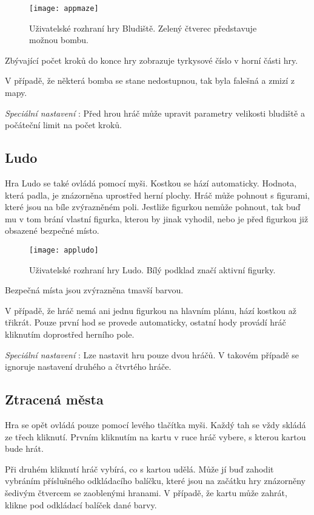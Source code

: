 \begin{figure}
  \centering
  \texttt{[image: appmaze]}
	\caption{Uživatelské rozhraní hry Bludiště. Zelený čtverec představuje možnou bombu. }
	\label{fig-appmaze}
\end{figure}

Zbývající počet kroků do konce hry zobrazuje tyrkysové číslo v horní části hry. 

V případě, že některá bomba se stane nedostupnou, tak byla falešná a zmizí z mapy.

\emph{Speciální nastavení} : Před hrou hráč může upravit parametry velikosti bludiště a počáteční limit na počet kroků.

\subsection{Ludo}

Hra Ludo se také ovládá pomocí myši. Kostkou se hází automaticky. Hodnota, která padla, je znázorněna uprostřed herní plochy. Hráč může pohnout s figurami, které jsou na bíle zvýrazněném poli. Jestliže figurkou nemůže pohnout, tak buď mu v tom brání vlastní figurka, kterou by jinak vyhodil, nebo je před figurkou již obsazené bezpečné místo.

\begin{figure}
  \centering
  \texttt{[image: appludo]}
	\caption{Uživatelské rozhraní hry Ludo. Bílý podklad značí aktivní figurky. }
	\label{fig-appludo}
\end{figure}

Bezpečná místa jsou zvýrazněna tmavší barvou.

V případě, že hráč nemá ani jednu figurkou na hlavním plánu, hází kostkou až třikrát. Pouze první hod se provede automaticky, ostatní hody provádí hráč kliknutím doprostřed herního pole.

\emph{Speciální nastavení} : Lze nastavit hru pouze dvou hráčů. V takovém případě se ignoruje nastavení druhého a čtvrtého hráče.

\subsection{Ztracená města}

Hra se opět ovládá pouze pomocí levého tlačítka myši. Každý tah se vždy skládá ze třech kliknutí. Prvním kliknutím na kartu v ruce hráč vybere, s kterou kartou bude hrát. 

Při druhém kliknutí hráč vybírá, co s kartou udělá. Může jí buď zahodit vybráním příslušného odkládacího balíčku, které jsou na začátku hry znázorněny šedivým čtvercem se zaoblenými hranami. V případě, že kartu může zahrát, klikne pod odkládací balíček dané barvy. 


